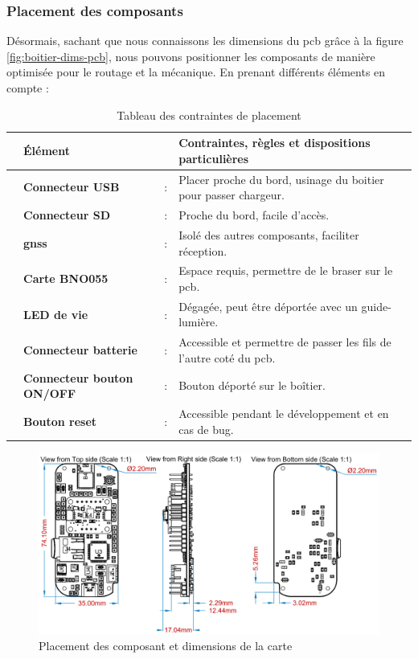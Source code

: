 \subsubsection{Placement des composants} \label{ssec:placementComp}
Désormais, sachant que nous connaissons les dimensions du \gls{pcb} grâce à la figure \ref{fig:boitier-dims-pcb}, nous pouvons positionner les composants de manière optimisée pour le routage et la mécanique. En prenant différents éléments en compte :

\begin{table}[!h]
\begin{adjustbox}{max width=\textwidth}
	\begin{tabular}{llll}
	\hline
	& Élément & & Contraintes, règles et dispositions particulières \\
	\hline
	\faChevronRight & \textbf{Connecteur USB} & : & Placer proche du bord, usinage du boitier pour passer chargeur. \\
	\faChevronRight & \textbf{Connecteur \micro SD} & : & Proche du bord, facile d'accès. \\
	\faChevronRight & \textbf{\gls{gnss}} & : & Isolé des autres composants, faciliter réception. \\
	\faChevronRight & \textbf{Carte BNO055} & : & Espace requis, permettre de le braser sur le \gls{pcb}. \\
	\faChevronRight & \textbf{LED de vie} & : & Dégagée, peut être déportée avec un guide-lumière. \\
	\faChevronRight & \textbf{Connecteur batterie} & : & Accessible et permettre de passer les fils de l'autre coté du \gls{pcb}. \\
	\faChevronRight & \textbf{Connecteur bouton ON/OFF} & : & Bouton déporté sur le boîtier. \\
	\faChevronRight & \textbf{Bouton reset} & : & Accessible pendant le développement et en cas de bug. \\
	\end{tabular}	
\end{adjustbox}
\label{tab:reglesPlacement}
\caption{Tableau des contraintes de placement}
\end{table}

\clearpage

\begin{figure}[h]
	\centering
	\includegraphics[width=1\linewidth]{../figures/dev-pcb/PCB-Dims}
	\caption{Placement des composant et dimensions de la carte}
	\label{fig:pcb-dims}
\end{figure}

